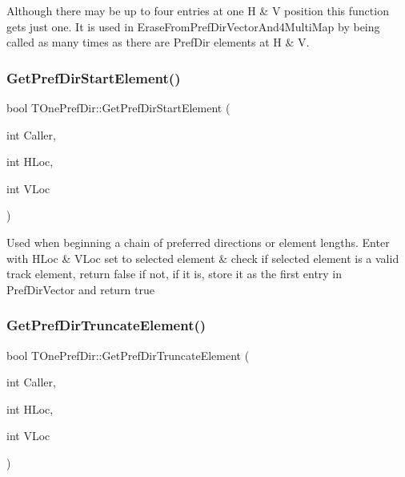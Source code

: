 Although there may be up to four entries at one H \& V position this function gets just one. It is used in Erase\+From\+Pref\+Dir\+Vector\+And4\+Multi\+Map by being called as many times as there are Pref\+Dir elements at H \& V. \mbox{\label{class_t_one_pref_dir_ace0402792492c9da2551423f8287e41e}} 
\subsubsection{\texorpdfstring{Get\+Pref\+Dir\+Start\+Element()}{GetPrefDirStartElement()}}
{\footnotesize\ttfamily bool T\+One\+Pref\+Dir\+::\+Get\+Pref\+Dir\+Start\+Element (\begin{DoxyParamCaption}\item[{int}]{Caller,  }\item[{int}]{H\+Loc,  }\item[{int}]{V\+Loc }\end{DoxyParamCaption})}

Used when beginning a chain of preferred directions or element lengths. Enter with H\+Loc \& V\+Loc set to selected element \& check if selected element is a valid track element, return false if not, if it is, store it as the first entry in Pref\+Dir\+Vector and return true \mbox{\label{class_t_one_pref_dir_a8fd55282096fe63f0baeab323c6ccc8b}} 
\subsubsection{\texorpdfstring{Get\+Pref\+Dir\+Truncate\+Element()}{GetPrefDirTruncateElement()}}
{\footnotesize\ttfamily bool T\+One\+Pref\+Dir\+::\+Get\+Pref\+Dir\+Truncate\+Element (\begin{DoxyParamCaption}\item[{int}]{Caller,  }\item[{int}]{H\+Loc,  }\item[{int}]{V\+Loc }\end{DoxyParamCaption})}

